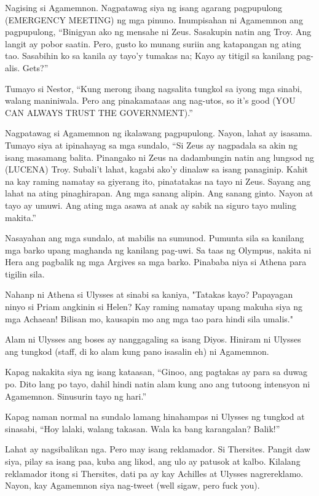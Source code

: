 \documentclass[12pt,letterpaper]{report}
\begin{document}
Nagising si Agamemnon. Nagpatawag siya ng isang agarang pagpupulong (EMERGENCY MEETING) ng mga pinuno. Inumpisahan ni Agamemnon ang pagpupulong, ``Binigyan ako ng mensahe ni Zeus. Sasakupin natin ang Troy. Ang langit ay pobor saatin. Pero, gusto ko munang suriin ang katapangan ng ating tao. Sasabihin ko sa kanila ay tayo'y tumakas na; Kayo ay titigil sa kanilang pag-alis. Gets?''

Tumayo si Nestor, ``Kung merong ibang nagsalita tungkol sa iyong mga sinabi, walang maniniwala. Pero ang pinakamataas ang nag-utos, so it's good (YOU CAN ALWAYS TRUST THE GOVERNMENT).''

Nagpatawag si Agamemnon ng ikalawang pagpupulong. Nayon, lahat ay isasama. Tumayo siya at ipinahayag sa mga sundalo, ``Si Zeus ay nagpadala sa akin ng isang masamang balita. Pinangako ni Zeus na dadambungin natin ang lungsod ng (LUCENA) Troy. Subali't lahat, kagabi ako'y dinalaw sa isang panaginip. Kahit na kay raming namatay sa giyerang ito, pinatatakas na tayo ni Zeus. Sayang ang lahat na ating pinaghirapan. Ang mga sanang alipin. Ang sanang ginto. Nayon at tayo ay umuwi. Ang ating mga asawa at anak ay sabik na siguro tayo muling makita.''

Nasayahan ang mga sundalo, at mabilis na sumunod. Pumunta sila sa kanilang mga barko upang maghanda ng kanilang pag-uwi. Sa taas ng Olympus, nakita ni Hera ang pagbalik ng mga Argives sa mga barko. Pinababa niya si Athena para tigilin sila.

Nahanp ni Athena si Ulysses at sinabi sa kaniya, "Tatakas kayo? Papayagan ninyo si Priam angkinin si Helen?
Kay raming namatay upang makuha siya ng mga Achaean! Bilisan mo, kausapin mo ang mga tao para hindi sila umalis."

Alam ni Ulysses ang boses ay nanggagaling sa isang Diyos. Hiniram ni Ulysses ang tungkod (staff, di ko alam kung pano isasalin eh) ni Agamemnon.

Kapag nakakita siya ng isang kataasan, ``Ginoo, ang pagtakas ay para sa duwag po. Dito lang po tayo, dahil hindi natin alam kung ano ang tutoong intensyon ni Agamemnon. Sinusurin tayo ng hari.''

Kapag naman normal na sundalo lamang hinahampas ni Ulysses ng tungkod at sinasabi, ``Hoy lalaki, walang takasan. Wala ka bang karangalan? Balik!''

Lahat ay nagsibalikan nga. Pero may isang reklamador. Si Thersites. Pangit daw siya, pilay sa isang paa, kuba ang likod, ang ulo ay patusok at kalbo. Kilalang reklamador itong si Thersites, dati pa ay kay Achilles at Ulysses nagrereklamo. Nayon, kay Agamemnon siya nag-tweet (well sigaw, pero fuck you).
\end{document}
